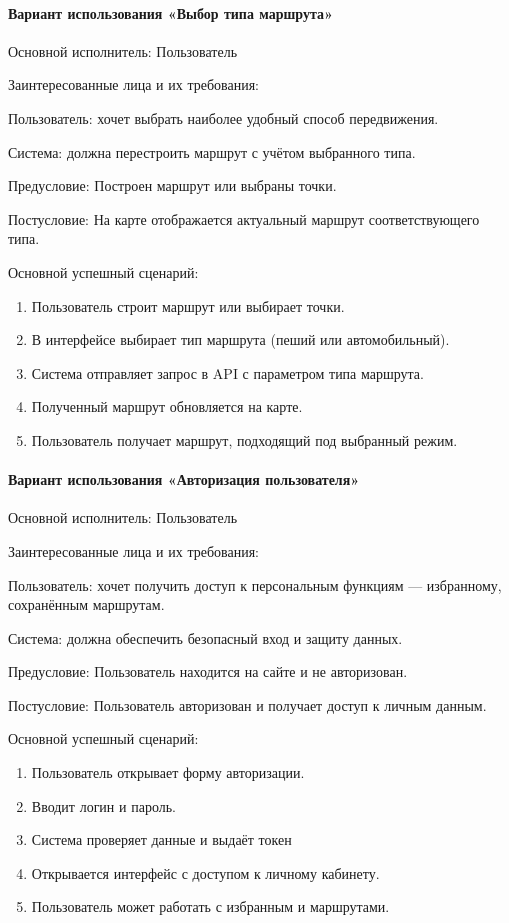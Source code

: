 \paragraph{Вариант использования «Выбор типа маршрута»}

Основной исполнитель: Пользователь

Заинтересованные лица и их требования:

Пользователь: хочет выбрать наиболее удобный способ передвижения.

Система: должна перестроить маршрут с учётом выбранного типа.

Предусловие: Построен маршрут или выбраны точки.

Постусловие: На карте отображается актуальный маршрут соответствующего типа.

Основной успешный сценарий:
\begin{enumerate}
	\item Пользователь строит маршрут или выбирает точки.
	\item В интерфейсе выбирает тип маршрута (пеший или автомобильный).
	\item Система отправляет запрос в API с параметром типа маршрута.
	\item Полученный маршрут обновляется на карте.
	\item Пользователь получает маршрут, подходящий под выбранный режим.
\end{enumerate}

\paragraph{Вариант использования «Авторизация пользователя»}

Основной исполнитель: Пользователь

Заинтересованные лица и их требования:

Пользователь: хочет получить доступ к персональным функциям — избранному, сохранённым маршрутам.

Система: должна обеспечить безопасный вход и защиту данных.

Предусловие: Пользователь находится на сайте и не авторизован.

Постусловие: Пользователь авторизован и получает доступ к личным данным.

Основной успешный сценарий:
\begin{enumerate}
	\item Пользователь открывает форму авторизации.
	\item Вводит логин и пароль.
	\item Система проверяет данные и выдаёт токен
	\item Открывается интерфейс с доступом к личному кабинету.
	\item Пользователь может работать с избранным и маршрутами.
\end{enumerate}

